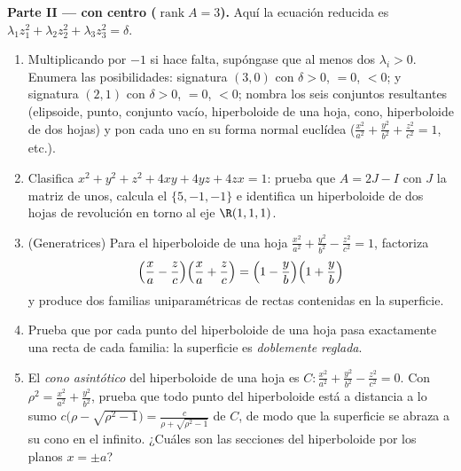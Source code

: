 \begin{problem}
\medskip
\noindent\textbf{Parte II ---  con centro
($\operatorname{rank}A = 3$).} Aquí la ecuación reducida es
$\lambda_1z_1^2 + \lambda_2z_2^2 + \lambda_3z_3^2 = \delta$.
\begin{enumerate}[resume]
  \item Multiplicando por $-1$ si hace falta, supóngase que al menos
        dos $\lambda_i > 0$. Enumera las posibilidades: signatura
        $(3, 0)$ con $\delta > 0$, $= 0$, $< 0$; y signatura $(2, 1)$
        con $\delta > 0$, $= 0$, $< 0$; nombra los seis conjuntos
        resultantes (elipsoide, punto, conjunto vacío, hiperboloide
        de una hoja, cono, hiperboloide de dos hojas) y pon cada uno
        en su forma normal euclídea ($\frac{x^2}{a^2} +
        \frac{y^2}{b^2} + \frac{z^2}{c^2} = 1$, etc.).
  \item Clasifica $x^2 + y^2 + z^2 + 4xy + 4yz + 4zx = 1$: prueba que
        $A = 2J - I$ con $J$ la matriz de unos, calcula el 
        $\{5, -1, -1\}$ e identifica un hiperboloide de dos hojas de
        revolución en torno al eje $\R(1,1,1)$.
  \item (Generatrices) Para el hiperboloide de una hoja
        $\frac{x^2}{a^2} + \frac{y^2}{b^2} - \frac{z^2}{c^2} = 1$,
        factoriza
        \[
        \Bigl(\frac xa - \frac zc\Bigr)
        \Bigl(\frac xa + \frac zc\Bigr)
        = \Bigl(1 - \frac yb\Bigr)\Bigl(1 + \frac yb\Bigr)
        \]
        y produce dos familias uniparamétricas de rectas contenidas
        en la superficie.
  \item Prueba que por cada punto del hiperboloide de una hoja pasa
        exactamente una recta de cada familia: la superficie es
        \emph{doblemente reglada}.
  \item El \emph{cono asintótico} del hiperboloide de una hoja es $C
        : \frac{x^2}{a^2} + \frac{y^2}{b^2} - \frac{z^2}{c^2} = 0$.
        Con $\rho^2 = \frac{x^2}{a^2} + \frac{y^2}{b^2}$, prueba que
        todo punto del hiperboloide está a distancia a lo sumo
        $c\bigl(\rho - \sqrt{\rho^2 - 1}\bigr) = \frac{c}{\rho +
        \sqrt{\rho^2 - 1}}$ de $C$, de modo que la superficie se
        abraza a su cono en el infinito. ¿Cuáles son las secciones
        del hiperboloide por los planos $x = \pm a$?
\end{enumerate}


\end{problem}
